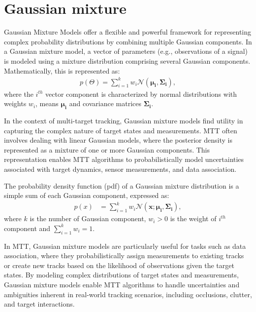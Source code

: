     \section{Gaussian mixture}
Gaussian Mixture Models offer a flexible and powerful framework for representing complex probability distributions by combining multiple Gaussian components. In a Gaussian mixture model, a vector of parameters (e.g., observations of a signal) is modeled using a mixture distribution comprising several Gaussian components. Mathematically, this is represented as:
    \begin{align}
        p(\Theta) = \sum_{i=1}^k w_i \mathcal{N}(\mathbf{\mu_i}, \mathbf{\Sigma_i}),
    \end{align}
where the $i^{th}$ vector component is characterized by normal distributions with weights $w_i$, means $\mathbf{\mu_i}$ and covariance matrices $\mathbf{\Sigma_i}$.

In the context of multi-target tracking, Gaussian mixture models find utility in capturing the complex nature of target states and measurements. MTT often involves dealing with linear Gaussian models, where the posterior density is represented as a mixture of one or more Gaussian components. This representation enables MTT algorithms to probabilistically model uncertainties associated with target dynamics, sensor measurements, and data association.

The probability density function (pdf) of a Gaussian mixture distribution is a simple sum of each Gaussian component, expressed as:
    \begin{align}
        p(x) &= \sum_{i=1}^k w_i\mathcal{N}(\mathbf{x};\mathbf{\mu_i}, \mathbf{\Sigma_i}),
    \end{align}
where $k$ is the number of Gaussian component, $w_i>0$ is the weight of $i^{th}$ component and $\sum_{i=1}^k w_i = 1$.

In MTT, Gaussian mixture models are particularly useful for tasks such as data association, where they probabilistically assign measurements to existing tracks or create new tracks based on the likelihood of observations given the target states. By modeling complex distributions of target states and measurements, Gaussian mixture models enable MTT algorithms to handle uncertainties and ambiguities inherent in real-world tracking scenarios, including occlusions, clutter, and target interactions.

